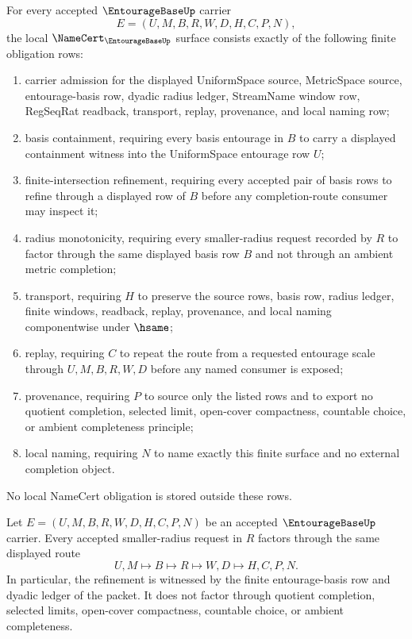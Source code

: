 \begin{theorem}
\label{thm:entourage-base-namecert-obligations}
For every accepted $\EntourageBaseUp$ carrier
$$
E=(U,M,B,R,W,D,H,C,P,N),
$$
the local $\NameCert_{\EntourageBaseUp}$ surface consists exactly of the following finite obligation rows:
\begin{enumerate}
\item carrier admission for the displayed UniformSpace source, MetricSpace source, entourage-basis row, dyadic radius ledger, StreamName window row, RegSeqRat readback, transport, replay, provenance, and local naming row;
\item basis containment, requiring every basis entourage in $B$ to carry a displayed containment witness into the UniformSpace entourage row $U$;
\item finite-intersection refinement, requiring every accepted pair of basis rows to refine through a displayed row of $B$ before any completion-route consumer may inspect it;
\item radius monotonicity, requiring every smaller-radius request recorded by $R$ to factor through the same displayed basis row $B$ and not through an ambient metric completion;
\item transport, requiring $H$ to preserve the source rows, basis row, radius ledger, finite windows, readback, replay, provenance, and local naming componentwise under $\hsame$;
\item replay, requiring $C$ to repeat the route from a requested entourage scale through $U,M,B,R,W,D$ before any named consumer is exposed;
\item provenance, requiring $P$ to source only the listed rows and to export no quotient completion, selected limit, open-cover compactness, countable choice, or ambient completeness principle;
\item local naming, requiring $N$ to name exactly this finite surface and no external completion object.
\end{enumerate}
No local NameCert obligation is stored outside these rows.
\end{theorem}

\begin{theorem}
\label{thm:entourage-base-finite-radius-refinement}
Let $E=(U,M,B,R,W,D,H,C,P,N)$ be an accepted $\EntourageBaseUp$ carrier. Every accepted smaller-radius request in $R$ factors through the same displayed route
$$
U,M \longmapsto B \longmapsto R \longmapsto W,D \longmapsto H,C,P,N .
$$
In particular, the refinement is witnessed by the finite entourage-basis row and dyadic ledger of the packet. It does not factor through quotient completion, selected limits, open-cover compactness, countable choice, or ambient completeness.
\end{theorem}

